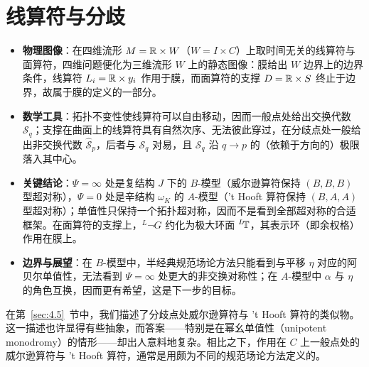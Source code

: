

\section{线算符与分歧}

\label{sec:5}

\begin{keytakeaways}
  \begin{itemize}[leftmargin=1.4em,itemsep=2pt,topsep=2pt]
    \item \textbf{物理图像}：在四维流形 $M={\mathbb{R}}\times W$（$W=I\times C$）上取时间无关的线算符与面算符，四维问题便化为三维流形 $W$ 上的静态图像：膜给出 $W$ 边界上的边界条件，线算符 $L_i={\mathbb{R}}\times y_i$ 作用于膜，而面算符的支撑 $D={\mathbb{R}}\times S$ 终止于边界，故属于膜的定义的一部分。
    \item \textbf{数学工具}：拓扑不变性使线算符可以自由移动，因而一般点处给出交换代数 ${\mathcal S}_{q}$；支撑在曲面上的线算符具有自然次序、无法彼此穿过，在分歧点处一般给出非交换代数 $\hat {\mathcal S}_p$，后者与 ${\mathcal S}_{q}$ 对易，且 ${\mathcal S}_{q}$ 沿 $q\to p$ 的（依赖于方向的）极限落入其中心。
    \item \textbf{关键结论}：$\Psi=\infty$ 处是复结构 $J$ 下的 $B$-模型（威尔逊算符保持 $(B,B,B)$ 型超对称），$\Psi=0$ 处是辛结构 $\omega_K$ 的 $A$-模型（'t Hooft 算符保持 $(B,A,A)$ 型超对称）；单值性只保持一个拓扑超对称，因而不是看到全部超对称的合适框架。在面算符的支撑上，$^L\neg G$ 约化为极大环面 $^L\negthinspace {\mathbb{T}}$，其表示环（即余权格）作用在膜上。
    \item \textbf{边界与展望}：在 $B$-模型中，半经典规范场论方法只能看到与平移 $\eta$ 对应的阿贝尔单值性，无法看到 $\Psi=\infty$ 处更大的非交换对称性；在 $A$-模型中 $\alpha$ 与 $\eta$ 的角色互换，因而更有希望，这是下一步的目标。
  \end{itemize}
\end{keytakeaways}

在第~\ref{sec:4.5}~节中，我们描述了分歧点处威尔逊算符与 't Hooft 算符的类似物。这一描述也许显得有些抽象，而答案——特别是在幂幺单值性（unipotent monodromy）的情形——却出人意料地复杂。相比之下，作用在 $C$ 上一般点处的威尔逊算符与 't Hooft 算符，通常是用颇为不同的规范场论方法定义的。

